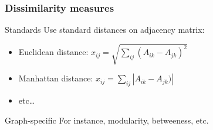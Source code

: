 \documentclass{beamer}\usepackage[]{graphicx}\usepackage[]{color}
\begin{document}
\begin{frame}
  \frametitle{Dissimilarity measures}

  \begin{block}{Standards}
    Use standard distances on adjacency matrix:
    \begin{itemize}
      \item Euclidean distance: $\displaystyle x_{ij} = \sqrt{\sum_{ij} (A_{ik} - A_{jk})^2} $
      \item Manhattan distance: $\displaystyle x_{ij} = \sum_{ij} |A_{ik} - A_{jk})| $
      \item  etc\dots
    \end{itemize}  
  \end{block}

  \vfill

  \begin{block}{Graph-specific}
    For instance,  modularity, betweeness, etc.
  \end{block}
  
\end{frame}
\end{document}
